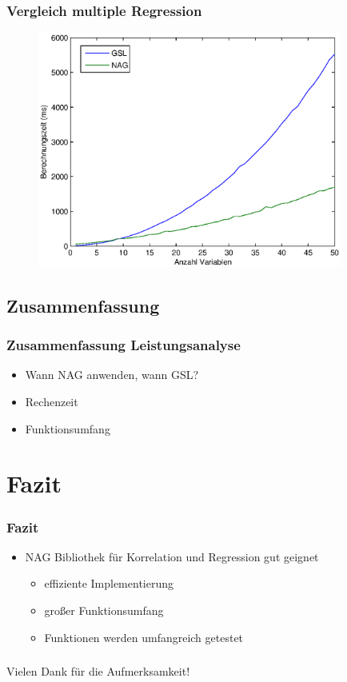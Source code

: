 \documentclass{beamer}
\begin{document}
\begin{frame}
  \frametitle{Vergleich multiple Regression}
  
  \begin{figure}[t]
    \centering
    \includegraphics[width=10cm]{figures/multi_reg_vars_2500_obs_rand.eps}
  \end{figure}

\end{frame}

\subsection{Zusammenfassung}
\begin{frame}
  \frametitle{Zusammenfassung Leistungsanalyse}
  
  \begin{itemize}
  \item Wann NAG anwenden, wann GSL?
  \item Rechenzeit
  \item Funktionsumfang
  \end{itemize}

\end{frame}


\section{Fazit}
\begin{frame}
  \frametitle{Fazit}
  
  \begin{itemize}
  \item NAG Bibliothek für Korrelation und Regression gut geignet
    \begin{itemize}
    \item effiziente Implementierung
    \item großer Funktionsumfang
    \item Funktionen werden umfangreich getestet
    \end{itemize}
  \end{itemize}
  
\end{frame}

\begin{frame}
  \frametitle{}

  \begin{center}
    {\Large Vielen Dank für die Aufmerksamkeit!}
  \end{center}

\end{frame}
\end{document}
